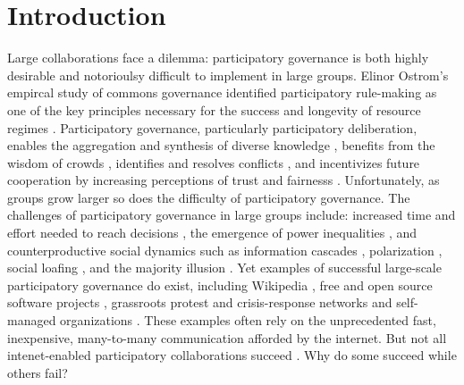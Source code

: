 \documentclass[manuscript,screen,review,acmsmall]{acmart}
\begin{document}
\section{Introduction}
Large collaborations face a dilemma:
participatory governance is both
highly desirable and notorioulsy difficult
to implement in large groups.
Elinor Ostrom's empircal study of commons governance identified participatory rule-making
as one of the key principles necessary for the success and longevity of resource regimes
\cite{ostrom_collective_2000, ostrom_governing_1990}.
Participatory governance, particularly participatory deliberation,
enables the aggregation and synthesis of diverse knowledge
\cite{
dewey_creative_1940,
anderson_epistemology_2006,
ackerman_deliberation_2002},
benefits from the wisdom of crowds
\cite{
surowiecki_wisdom_2005,
hill_group_1982,
hong_groups_2004,
golub_naive_2010,
galton_vox_1907},
identifies and resolves conflicts
\cite{gentry_consensus_1982},
and incentivizes future cooperation by increasing perceptions of trust and fairnesss
\cite{
ostrom_collective_2000,
bowles_endogenous_1998}.
Unfortunately, as groups grow larger so does the difficulty of participatory governance.
The challenges of participatory governance in large groups include:
increased time and effort needed to reach decisions
\cite{
fishkin_voice_1997,
gentry_consensus_1982,
steiner_group_1972},
the emergence of power inequalities
\cite{
freeman_tyranny_1972,
shaw_laboratories_2014,
kittur_power_2007,
boehm_egalitarian_1993},
and counterproductive social dynamics such as
information cascades \cite{banerjee_simple_1992},
polarization \cite{schkade_what_2007},
social loafing \cite{karau_social_1993},
and the majority illusion \cite{lerman_majority_2015}.
Yet examples of successful large-scale participatory governance do exist, including Wikipedia \cite{giles_internet_2005, keegan_evolution_2017, forte_scaling_2008}, free and open source software projects \cite{benkler_coases_2002}, grassroots protest and crisis-response networks \cite{manilov_occupy_2013, tufekci_twitter_2017,
gonzalez-bailon_networked_2016,
landau_place-based_2017,
brugh_combining_2019}
and self-managed organizations
\cite{laloux_reinventing_2014,monsen_buurtzorg_2013,robertson_holacracy_2015}.
These examples often rely on the unprecedented fast, inexpensive, many-to-many communication afforded by the internet.
But not all intenet-enabled participatory collaborations succeed \cite{tufekci_twitter_2017, geiger_does_2009}. Why do some succeed while others fail?
\end{document}
